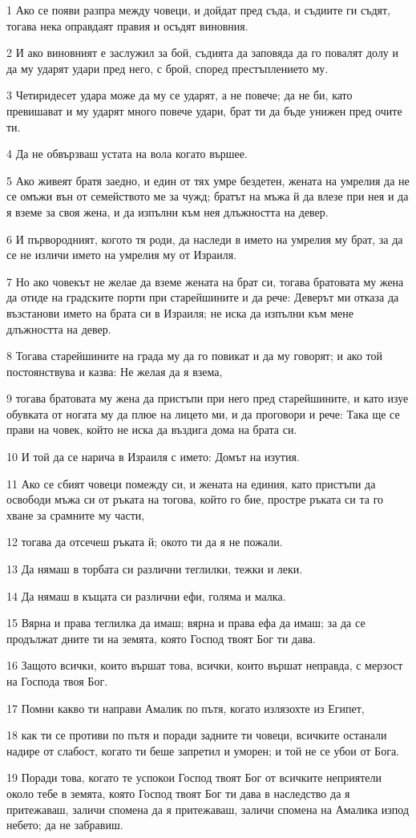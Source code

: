 \par 1 Ако се появи разпра между човеци, и дойдат пред съда, и съдиите ги съдят, тогава нека оправдаят правия и осъдят виновния.
\par 2 И ако виновният е заслужил за бой, съдията да заповяда да го повалят долу и да му ударят удари пред него, с брой, според престъплението му.
\par 3 Четиридесет удара може да му се ударят, а не повече; да не би, като превишават и му ударят много повече удари, брат ти да бъде унижен пред очите ти.
\par 4 Да не обвързваш устата на вола когато вършее.
\par 5 Ако живеят братя заедно, и един от тях умре бездетен, жената на умрелия да не се омъжи вън от семейството ме за чужд; братът на мъжа й да влезе при нея и да я вземе за своя жена, и да изпълни към нея длъжността на девер.
\par 6 И първородният, когото тя роди, да наследи в името на умрелия му брат, за да се не изличи името на умрелия му от Израиля.
\par 7 Но ако човекът не желае да вземе жената на брат си, тогава братовата му жена да отиде на градските порти при старейшините и да рече: Деверът ми отказа да възстанови името на брата си в Израиля; не иска да изпълни към мене длъжността на девер.
\par 8 Тогава старейшините на града му да го повикат и да му говорят; и ако той постоянствува и казва: Не желая да я взема,
\par 9 тогава братовата му жена да пристъпи при него пред старейшините, и като изуе обувката от ногата му да плюе на лицето ми, и да проговори и рече: Така ще се прави на човек, който не иска да въздига дома на брата си.
\par 10 И той да се нарича в Израиля с името: Домът на изутия.
\par 11 Ако се сбият човеци помежду си, и жената на единия, като пристъпи да освободи мъжа си от ръката на тогова, който го бие, простре ръката си та го хване за срамните му части,
\par 12 тогава да отсечеш ръката й; окото ти да я не пожали.
\par 13 Да нямаш в торбата си различни теглилки, тежки и леки.
\par 14 Да нямаш в къщата си различни ефи, голяма и малка.
\par 15 Вярна и права теглилка да имаш; вярна и права ефа да имаш; за да се продължат дните ти на земята, която Господ твоят Бог ти дава.
\par 16 Защото всички, които вършат това, всички, които вършат неправда, с мерзост на Господа твоя Бог.
\par 17 Помни какво ти направи Амалик по пътя, когато излязохте из Египет,
\par 18 как ти се противи по пътя и поради задните ти човеци, всичките останали надире от слабост, когато ти беше запретил и уморен; и той не се убои от Бога.
\par 19 Поради това, когато те успокои Господ твоят Бог от всичките неприятели около тебе в земята, която Господ твоят Бог ти дава в наследство да я притежаваш, заличи спомена да я притежаваш, заличи спомена на Амалика изпод небето; да не забравиш.


